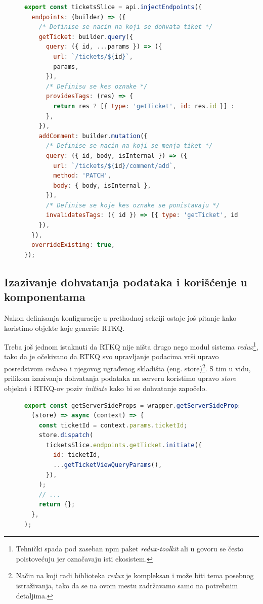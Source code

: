 \documentclass[12pt,oneside]{memoir}
\begin{document}
\begin{figure}[h]
\begin{lstlisting}[language=JavaScript, style=ES6, caption={Konfiguracija API poziva za dohvatanje tiketa i dodavanje komentara}, label={lst:rtkqconfigtickets}]
export const ticketsSlice = api.injectEndpoints({
  endpoints: (builder) => ({
    /* Definise se nacin na koji se dohvata tiket */
    getTicket: builder.query({
      query: ({ id, ...params }) => ({
        url: `/tickets/${id}`,
        params,
      }),
      /* Definisu se kes oznake */
      providesTags: (res) => {
        return res ? [{ type: 'getTicket', id: res.id }] : [];
      },
    }),
    addComment: builder.mutation({
      /* Definise se nacin na koji se menja tiket */
      query: ({ id, body, isInternal }) => ({
        url: `/tickets/${id}/comment/add`,
        method: 'PATCH',
        body: { body, isInternal },
      }),
      /* Definise se koje kes oznake se ponistavaju */
      invalidatesTags: ({ id }) => [{ type: 'getTicket', id }],
    }),
  }),
  overrideExisting: true,
});
\end{lstlisting}
\end{figure}

\subsection{Izazivanje dohvatanja podataka i korišćenje u komponentama}

Nakon definisanja konfiguracije u prethodnoj sekciji ostaje još pitanje kako koristimo objekte koje generiše RTKQ.

Treba još jednom istaknuti da RTKQ nije ništa drugo nego modul sistema \textit{redux}\footnote{Tehnički spada pod zaseban npm paket \textit{redux-toolkit} ali u govoru se često poistovećuju jer označavaju isti ekosistem.}, tako da je očekivano da RTKQ svo upravljanje podacima vrši upravo posredstvom \textit{redux}-a i njegovog ugrađenog skladišta (eng. store)\footnote{Način na koji radi biblioteka \textit{redux} je kompleksan i može biti tema posebnog istraživanja, tako da se na ovom mestu zadržavamo samo na potrebnim detaljima.}. S tim u vidu, prilikom izazivanja dohvatanja podataka na serveru koristimo upravo \textit{store} objekat i RTKQ-ov poziv \textit{initiate} kako bi se dohvatanje započelo.

\begin{figure}[h]
\begin{lstlisting}[language=JavaScript, style=ES6, caption={Dohvatanje podataka o tiketu na serveru.}]
export const getServerSideProps = wrapper.getServerSideProps(
  (store) => async (context) => {
    const ticketId = context.params.ticketId;
    store.dispatch(
      ticketsSlice.endpoints.getTicket.initiate({
        id: ticketId,
        ...getTicketViewQueryParams(),
      }),
    );
    // ...
    return {};
  },
);
\end{lstlisting}
\end{figure}
\end{document}
